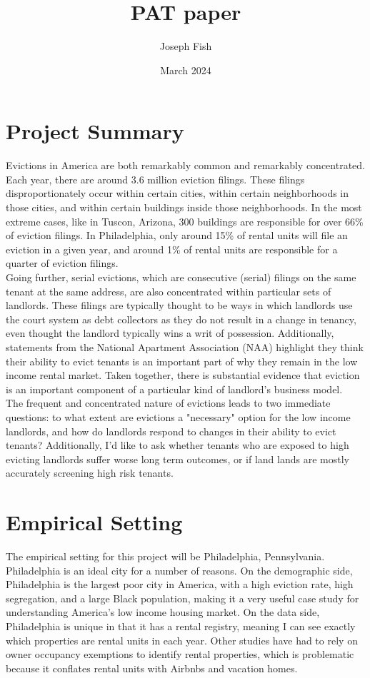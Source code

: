 \documentclass{article}
\title{PAT paper}
\author{Joseph Fish}
\date{March 2024}
\begin{document}
\section{Project Summary}

Evictions in America are both remarkably common and remarkably concentrated. Each year, there are around 3.6 million eviction filings. These filings disproportionately occur within certain cities, within certain neighborhoods in those cities, and within certain buildings inside those neighborhoods. In the most extreme cases, like in Tuscon, Arizona, 300 buildings are responsible for over 66\% of eviction filings. In Philadelphia, only around 15\% of rental units will file an eviction in a given year, and around 1\% of rental units are responsible for a quarter of eviction filings. \\

Going further, serial evictions, which are consecutive (serial) filings on the same tenant at the same address, are also concentrated within particular sets of landlords. These filings are typically thought to be ways in which landlords use the court system as debt collectors as they do not result in a change in tenancy, even thought the landlord typically wins a writ of possession. Additionally, statements from the National  Apartment Association (NAA) highlight they think their ability to evict tenants is an important part of why they remain in the low income rental market. Taken together, there is substantial evidence that eviction is an important component of a particular kind of landlord's business model. \\

The frequent and concentrated nature of evictions leads to two immediate questions: to what extent are evictions a "necessary" option for the low income landlords, and how do landlords respond to changes in their ability to evict tenants? Additionally, I'd like to ask whether tenants who are exposed to high evicting landlords suffer worse long term outcomes, or if land lands are mostly accurately screening high risk tenants.

\section{Empirical Setting}

The empirical setting for this project will be Philadelphia, Pennsylvania. Philadelphia is an ideal city for a number of reasons. On the demographic side, Philadelphia is the largest poor city in America, with a high eviction rate, high segregation, and a large Black population, making it a very useful case study for understanding America's low income housing market. On the data side, Philadelphia is unique in that it has a rental registry, meaning I can see exactly which properties are rental units in each year. Other studies have had to rely on owner occupancy exemptions to identify rental properties, which is problematic because it conflates rental units with Airbnbs and vacation homes. \\
\end{document}
